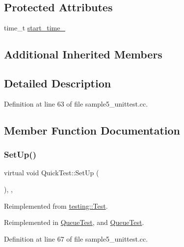 \subsection*{Protected Attributes}
\begin{DoxyCompactItemize}
\item 
time\+\_\+t \hyperlink{classQuickTest_aba6a28bbd733e72e3b088a0b66386809}{start\+\_\+time\+\_\+}
\end{DoxyCompactItemize}
\subsection*{Additional Inherited Members}


\subsection{Detailed Description}


Definition at line 63 of file sample5\+\_\+unittest.\+cc.



\subsection{Member Function Documentation}
\mbox{\label{classQuickTest_ae52ad082887512b92240ce40a1a05650}} 
\subsubsection{\texorpdfstring{Set\+Up()}{SetUp()}}
{\footnotesize\ttfamily virtual void Quick\+Test\+::\+Set\+Up (\begin{DoxyParamCaption}{ }\end{DoxyParamCaption})\hspace{0.3cm}{\ttfamily [inline]}, {\ttfamily [protected]}, {\ttfamily [virtual]}}



Reimplemented from \hyperlink{classtesting_1_1Test_a57a4116f39f6636a80710ded7d42e889}{testing\+::\+Test}.



Reimplemented in \hyperlink{classQueueTest_a91e69958f086239a523864d6b94ab174}{Queue\+Test}, and \hyperlink{classQueueTest_a91e69958f086239a523864d6b94ab174}{Queue\+Test}.



Definition at line 67 of file sample5\+\_\+unittest.\+cc.



